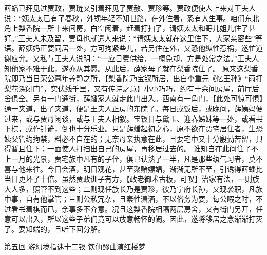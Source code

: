 \documentclass[12pt,oneside]{book}
\begin{document}
薛蟠已拜见过贾政，贾琏又引着拜见了贾赦、贾珍等。贾政便使人上来对王夫人说：“姨太太已有了春秋，外甥年轻不知世路，在外住着，恐有人生事。咱们东北角上梨香院一所十来间房，白空闲着，赶着打扫了，请姨太太和哥儿姐儿住了甚好。”王夫人未及留，贾母也就遣人来说：“请姨太太就在这里住下，大家亲密些”等语。薛姨妈正要同居一处，方可拘紧些儿，若另住在外，又恐他纵性惹祸，遂忙道谢应允。又私与王夫人说明：“一应日费供给，一概免却，方是处常之法。”王夫人知他家不难于此，遂亦从其愿。从此后，薛家母子就在梨香院住了。
原来这梨香院即乃当日荣公暮年养静之所，【梨香院乃宝钗所居，出自李重元《忆王孙》“雨打梨花深闭门”，实伏线千里，又有传诗之意】小小巧巧，约有十余间房屋，前厅后舍俱全。另有一门通街，薛蟠家人就走此门出入。西南有一角门，【此处可惊可惧】通一夹道，出了夹道，便是王夫人正房的东院了。每日或饭后，或晚间，薛姨妈便过来，或与贾母闲谈，或与王夫人相叙。宝钗日与黛玉、迎春姊妹等一处，或看书下棋，或作针黹，倒也十分乐业。只是薛蟠起初之心，原不欲在贾宅居住者，生恐姨父管约拘禁，料必不自在的；无奈母亲执意在此，且要宅中又十分殷勤苦留，只得暂且住下；一面使人打扫出自己的房屋，再移居过去的。
谁知自在此间住了不上一月的光景，贾宅族中凡有的子侄，俱已认熟了一半，凡是那些纨气习者，莫不喜与他来往。今日会酒，明日观花，甚至聚赌嫖娼，渐渐无所不至，引诱得薛蟠比当日更坏了十倍。虽然贾政训子有方，【政老御术古板，可叹】治家有法，一则族大人多，照管不到这些；二则现任族长乃是贾珍，彼乃宁府长孙，又现袭职，凡族中事，自有他掌管；三则公私冗杂，且素性潇洒，不以俗务为要，每公暇之时，不过看书着棋而已，余事多不介意。况且这梨香院相隔两层房舍，又有街门另开，任意可以出入，所以这些子弟们竟可以放意畅怀的闹。因此，遂将移居之念渐渐打灭了。要知端的，且听下回分解。


 
第五回  游幻境指迷十二钗  饮仙醪曲演红楼梦
\end{document}
